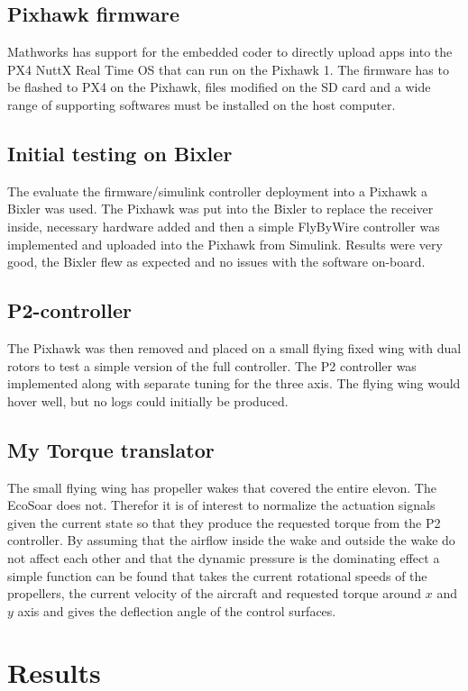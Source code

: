 \documentclass{article}
\begin{document}
\subsection{Pixhawk firmware}
Mathworks has support for the embedded coder to directly upload apps into the PX4 NuttX Real Time OS that can run on the Pixhawk 1.
The firmware has to be flashed to PX4 on the Pixhawk, files modified on the SD card and a wide range of supporting softwares must be installed on the host computer.

\subsection{Initial testing on Bixler}
The evaluate the firmware/simulink controller deployment into a Pixhawk a Bixler was used.
The Pixhawk was put into the Bixler to replace the receiver inside, necessary hardware added and then a simple FlyByWire controller was implemented and uploaded into the Pixhawk from Simulink.
Results were very good, the Bixler flew as expected and no issues with the software on-board.
\subsection{P2-controller}
The Pixhawk was then removed and placed on a small flying fixed wing with dual rotors to test a simple version of the full controller.
The P2 controller \cite{P2} was implemented along with separate tuning for the three axis.
The flying wing would hover well, but no logs could initially be produced.

\subsection{My Torque translator}
The small flying wing has propeller wakes that covered the entire elevon.
The EcoSoar does not.
Therefor it is of interest to normalize the actuation signals given the current state so that they produce the requested torque from the P2 controller.
By assuming that the airflow inside the wake and outside the wake do not affect each other and that the dynamic pressure is the dominating effect a simple function can be found that takes the current rotational speeds of the propellers, the current velocity of the aircraft and requested torque around $x$ and $y$ axis and gives the deflection angle of the control surfaces.


\section{Results}
\end{document}
